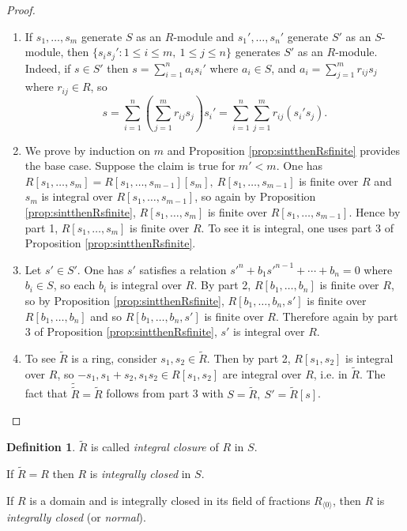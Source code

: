 \documentclass[a4paper]{article}
\newcommand{\la}{\langle}
\newcommand{\ra}{\rangle}
\theoremstyle{definition}
\newtheorem{defn}{Definition}[subsection]
\begin{document}
\begin{proof}
\begin{enumerate}
\item If $s_1,\ldots,s_m$ generate $S$ as an $R$-module and $s_1',\ldots,s_n'$ generate $S'$ as an $S$-module, then $\{s_is_j':1\leq i\leq m,\ 1\leq j\leq n\}$ generates $S'$ as an $R$-module. Indeed, if $s\in S'$ then $s=\sum_{i=1}^n a_is_i'$ where $a_i\in S$, and $a_i=\sum_{j=1}^m r_{ij}s_j$ where $r_{ij}\in R$, so
\[
s=\sum_{i=1}^n \left(\sum_{j=1}^m r_{ij}s_j\right)s_i'=\sum_{i=1}^n \sum_{j=1}^m r_{ij} (s_i's_j).
\]
\item We prove by induction on $m$ and Proposition \ref{prop:sintthenRsfinite} provides the base case. Suppose the claim is true for $m'<m$. One has $R[s_1,\ldots,s_m]=R[s_1,\ldots,s_{m-1}][s_m],\ R[s_1,\ldots,s_{m-1}]$ is finite over $R$ and $s_m$ is integral over $R[s_1,\ldots,s_{m-1}]$, so again by Proposition \ref{prop:sintthenRsfinite}, $R[s_1,\ldots,s_m]$ is finite over $R[s_1,\ldots,s_{m-1}]$. Hence by part 1, $R[s_1,\ldots,s_{m}]$ is finite over $R$. To see it is integral, one uses part 3 of Proposition \ref{prop:sintthenRsfinite}.
\item Let $s'\in S'$. One has $s'$ satisfies a relation $s'^n+b_1s'^{n-1}+\cdots+b_n=0$ where $b_i\in S$, so each $b_i$ is integral over $R$. By part 2, $R[b_1,\ldots,b_n]$ is finite over $R$, so by Proposition \ref{prop:sintthenRsfinite}, $R[b_1,\ldots,b_n,s']$ is finite over $R[b_1,\ldots,b_n]$ and so $R[b_1,\ldots,b_n,s']$ is finite over $R$. Therefore again by part 3 of Proposition \ref{prop:sintthenRsfinite}, $s'$ is integral over $R$.
\item To see $\widetilde R$ is a ring, consider $s_1,s_2\in\widetilde R$. Then by part 2, $R[s_1,s_2]$ is integral over $R$, so $-s_1,s_1+s_2,s_1s_2\in R[s_1,s_2]$ are integral over $R$, i.e. in $\widetilde R$. The fact that $\widetilde{\widetilde R}=\widetilde R$ follows from part 3 with $S=\widetilde R,\ S'=\widetilde R[s]$.
\end{enumerate}
\end{proof}

\begin{defn}
$\widetilde R$ is called \textit{integral closure} of $R$ in $S$.

If $\widetilde R=R$ then $R$ is \textit{integrally closed} in $S$.

If $R$ is a domain and is integrally closed in its field of fractions $R_{\la 0\ra}$, then $R$ is \textit{integrally closed} (or \textit{normal}).
\end{defn}
\end{document}
